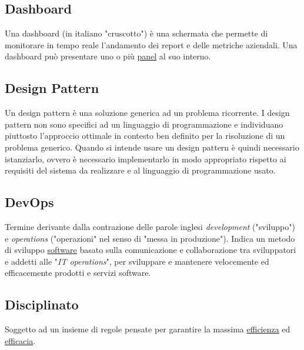 	\newpage

	
	\subsection{Dashboard}
	\label{sec:dashboard}
	Una dashboard (in italiano "cruscotto") è una schermata che permette di monitorare in tempo reale l’andamento dei report e delle metriche aziendali. Una dashboard può presentare uno o più \underline{\hyperref[sec:panel]{panel}} al suo interno.

	
	\subsection{Design Pattern}
	\label{sec:designpatter}
	Un design pattern è una soluzione generica ad un problema ricorrente. I design pattern non sono specifici ad un linguaggio di programmazione e individuano piuttosto l'approccio ottimale in contesto ben definito per la risoluzione di un problema generico. Quando si intende usare un design pattern è quindi necessario istanziarlo, ovvero è necessario implementarlo in modo appropriato rispetto ai requisiti del sistema da realizzare e al linguaggio di programmazione usato.

		
	\subsection{DevOps}
	\label{sec:devops}
	Termine derivante dalla contrazione delle parole inglesi \emph{development} ("sviluppo") e \emph{operations} ("operazioni" nel senso di "messa in produzione"). Indica un metodo di sviluppo \underline{\hyperref[sec:prodottosoftware]{software}} basato sulla comunicazione e collaborazione tra sviluppatori e addetti alle "\emph{IT operations}", per sviluppare e mantenere velocemente ed efficacemente prodotti e servizi software.


	\subsection{Disciplinato}
	\label{sec:disciplinato}
	Soggetto ad un insieme di regole pensate per garantire la massima \underline{\hyperref[sec:efficienza]{efficienza}} ed \underline{\hyperref[sec:efficacia]{efficacia}}.

	\newpage


